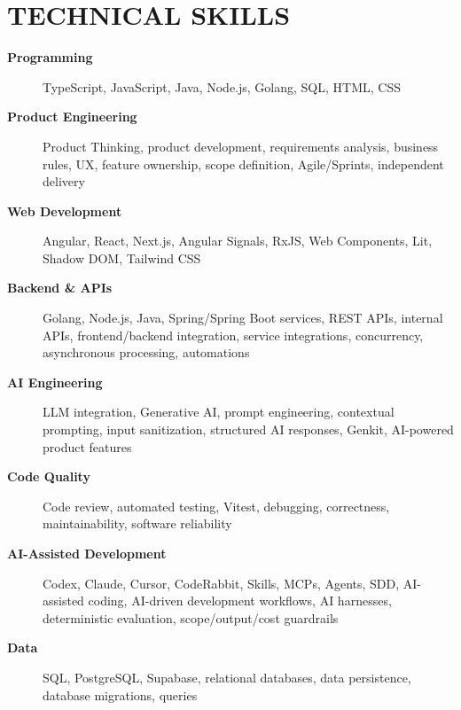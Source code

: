 \documentclass[10pt,a4paper]{article}
\begin{document}

\section*{TECHNICAL SKILLS}

\footnotesize

\begin{description}

    \item[\textbf{Programming}]
    TypeScript, JavaScript, Java, Node.js, Golang, SQL, HTML, CSS

    \item[\textbf{Product Engineering}]
    Product Thinking, product development, requirements analysis,
    business rules, UX, feature ownership, scope definition,
    Agile/Sprints, independent delivery

    \item[\textbf{Web Development}]
    Angular, React, Next.js, Angular Signals, RxJS,
    Web Components, Lit, Shadow DOM, Tailwind CSS

    \item[\textbf{Backend \& APIs}]
    Golang, Node.js, Java, Spring/Spring Boot services, REST APIs, internal APIs,
    frontend/backend integration, service integrations,
    concurrency, asynchronous processing, automations

    \item[\textbf{AI Engineering}]
    LLM integration, Generative AI, prompt engineering,
    contextual prompting, input sanitization,
    structured AI responses, Genkit,
    AI-powered product features

    \item[\textbf{Code Quality}]
    Code review, automated testing, Vitest,
    debugging, correctness, maintainability,
    software reliability

    \item[\textbf{AI-Assisted Development}]
    Codex, Claude, Cursor, CodeRabbit, Skills,
    MCPs, Agents, SDD, AI-assisted coding,
    AI-driven development workflows, AI harnesses,
    deterministic evaluation, scope/output/cost guardrails

    \item[\textbf{Data}]
    SQL, PostgreSQL, Supabase, relational databases,
    data persistence, database migrations, queries


\end{description}
\end{document}
